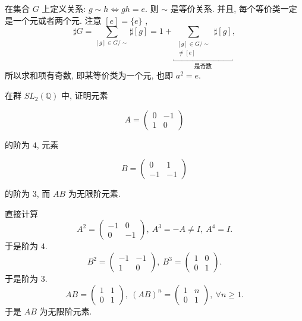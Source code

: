 \begin{solution}
    在集合 $G$ 上定义关系: $g\sim h\iff g h=e$. 则 $\sim$ 是等价关系. 
    并且, 每个等价类一定是一个元或者两个元. 
    注意 $[e]=\{e\}$ , 
        \[
            \sharp G=\sum_{[g]\in G/\sim}\sharp [g]=1+\underbracket{\sum_{\substack{[g]\in G/\sim\\ [g]\ne [e]}}\sharp [g]}_{\text{是奇数}},
        \]
    所以求和项有奇数, 即某等价类为一个元, 也即 $a^{2}=e$.
\end{solution}

\setcounter{pb}{16}

\begin{problem}
在群 $SL_2(\mathbb{Q})$ 中, 证明元素

\[
A = \begin{pmatrix} 0 & -1 \\ 1 & 0 \end{pmatrix}
\]

的阶为 $4$, 元素

\[
B = \begin{pmatrix} 0 & 1 \\ -1 & -1 \end{pmatrix}
\]

的阶为 $3$, 而 $AB$ 为无限阶元素.
\end{problem}

\begin{solution}
    直接计算
        \[
            A^{2}=\begin{pmatrix}
        -1&0\\0&-1
    \end{pmatrix},\ A^{3}=-A\ne I,\ A^{4}=I.
        \]
    于是阶为 $4$. 
        \[
            B^{2}=\begin{pmatrix}
                -1&-1\\1&0
            \end{pmatrix},\ B^{3}=\begin{pmatrix}
                1&0\\0&1
            \end{pmatrix}.
        \]
    于是阶为 $3$.
        \[
            A B=\begin{pmatrix}
                1&1\\0&1
            \end{pmatrix},\ (A B)^{n}=\begin{pmatrix}
                1&n\\0&1
            \end{pmatrix},\ \forall n\geq1.
        \]
    于是 $AB$ 为无限阶元素.
\end{solution}

